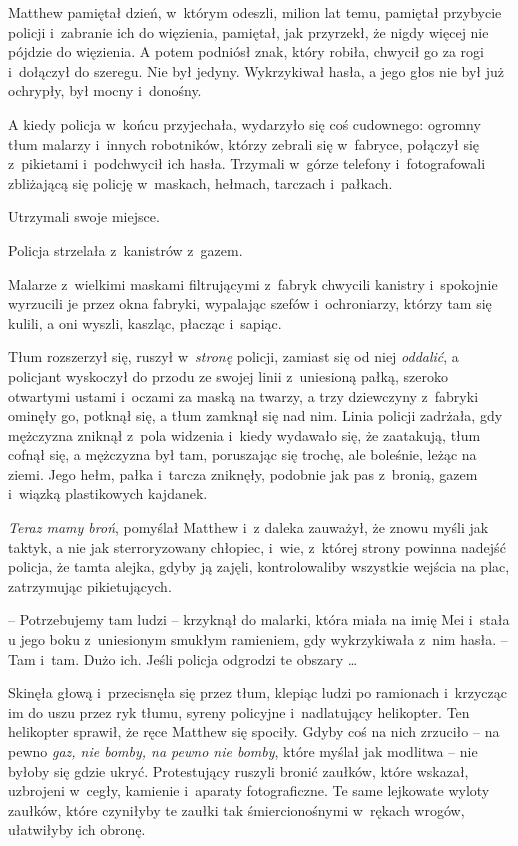 \documentclass[oneside,polish,11pt,rmheadings]{mwbk}
\begin{document}
Matthew pamiętał dzień, w~którym odeszli, milion lat temu, pamiętał przybycie policji i~zabranie ich do więzienia, pamiętał, jak przyrzekł, że nigdy więcej nie pójdzie do więzienia. A potem podniósł znak, który robiła, chwycił go za rogi i~dołączył do szeregu. Nie był jedyny. Wykrzykiwał hasła, a jego głos nie był już ochrypły, był mocny i~donośny.

A kiedy policja w~końcu przyjechała, wydarzyło się coś cudownego: ogromny tłum malarzy i~innych robotników, którzy zebrali się w~fabryce, połączył się z~pikietami i~podchwycił ich hasła. Trzymali w~górze telefony i~fotografowali zbliżającą się policję w~maskach, hełmach, tarczach i~pałkach.

Utrzymali swoje miejsce.

Policja strzelała z~kanistrów z~gazem.

Malarze z~wielkimi maskami filtrującymi z~fabryk chwycili kanistry i~spokojnie wyrzucili je przez okna fabryki, wypalając szefów i~ochroniarzy, którzy tam się kulili, a oni wyszli, kaszląc, płacząc i~sapiąc.

Tłum rozszerzył się, ruszył w~\textit{stronę }policji, zamiast się od niej \textit{oddalić}, a policjant wyskoczył do przodu ze swojej linii z~uniesioną pałką, szeroko otwartymi ustami i~oczami za maską na twarzy, a trzy dziewczyny z~fabryki ominęły go, potknął się, a tłum zamknął się nad nim. Linia policji zadrżała, gdy mężczyzna zniknął z~pola widzenia i~kiedy wydawało się, że zaatakują, tłum cofnął się, a mężczyzna był tam, poruszając się trochę, ale boleśnie, leżąc na ziemi. Jego hełm, pałka i~tarcza zniknęły, podobnie jak pas z~bronią, gazem i~wiązką plastikowych kajdanek.

\textit{Teraz mamy broń}, pomyślał Matthew i~z daleka zauważył, że znowu myśli jak taktyk, a nie jak sterroryzowany chłopiec, i~wie, z~której strony powinna nadejść policja, że tamta alejka, gdyby ją zajęli, kontrolowaliby wszystkie wejścia na plac, zatrzymując pikietujących.

-- Potrzebujemy tam ludzi -- krzyknął do malarki, która miała na imię Mei i~stała u jego boku z~uniesionym smukłym ramieniem, gdy wykrzykiwała z~nim hasła. -- Tam i~tam. Dużo ich. Jeśli policja odgrodzi te obszary \ldots 

Skinęła głową i~przecisnęła się przez tłum, klepiąc ludzi po ramionach i~krzycząc im do uszu przez ryk tłumu, syreny policyjne i~nadlatujący helikopter. Ten helikopter sprawił, że ręce Matthew się spociły. Gdyby coś na nich zrzuciło -- na pewno \textit{gaz, nie bomby, na pewno nie bomby}, które myślał jak modlitwa -- nie byłoby się gdzie ukryć. Protestujący ruszyli bronić zaułków, które wskazał, uzbrojeni w~cegły, kamienie i~aparaty fotograficzne. Te same lejkowate wyloty zaułków, które czyniłyby te zaułki tak śmiercionośnymi w~rękach wrogów, ułatwiłyby ich obronę.
\end{document}
